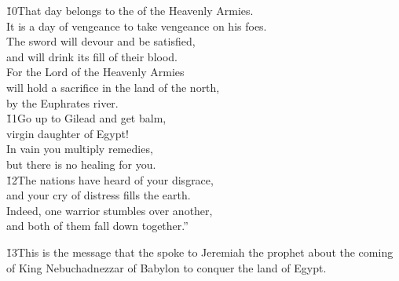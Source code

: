 \begin{poetry}
\poeml \v{10}That day belongs to the  of the Heavenly Armies. \\
\poemll    It is a day of vengeance to take vengeance on his foes. \\
\poeml The sword will devour and be satisfied, \\
\poemll    and will drink its fill of their blood. \\
\poeml For the Lord  of the Heavenly Armies \\
\poemll    will hold a sacrifice in the land of the north, \\
\poemlll       by the Euphrates river. \\
\poeml \v{11}Go up to Gilead and get balm, \\
\poemll    virgin daughter of Egypt! \\
\poeml In vain you multiply remedies, \\
\poemll    but there is no healing for you. \\
\poeml \v{12}The nations have heard of your disgrace, \\
\poemll    and your cry of distress fills the earth. \\
\poeml Indeed, one warrior stumbles over another, \\
\poemll    and both of them fall down together.''
\end{poetry}

\v{13}This is the message that the  spoke to Jeremiah the prophet about the coming of King Nebuchadnezzar of Babylon to conquer the land of Egypt.

